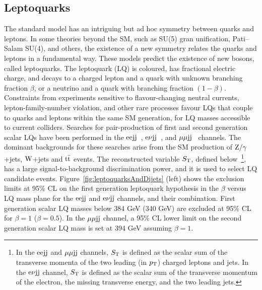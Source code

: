 \documentclass[11pt]{article}
\def\pt{\ensuremath{p_{\rm T}}\xspace}
\def\eejj{$\rm{eejj}$\xspace}
\def\mumujj{$\mu\mu \rm{jj}$\xspace}
\def\enujj{$\rm{e}\nu \rm{jj}$\xspace}
\def\zjets{\ensuremath{\rm{Z}/\gamma}+jets\xspace}
\def\wjets{\ensuremath{\rm{W}}+jets\xspace}
\def\ttbar{\ensuremath{\rm{t} \bar{\rm{t}}}\xspace}
\def\ST{\ensuremath{S_{\rm T}}\xspace}
\begin{document}
\subsection{Leptoquarks}

The standard model has an intriguing but ad hoc symmetry between 
quarks and leptons. In some theories beyond the SM, such 
as SU(5) gran unification, Pati--Salam SU(4), and others, the existence of a new symmetry 
relates the quarks and leptons in a fundamental way. These models 
predict the existence of new bosons, called leptoquarks. 
The leptoquark (LQ) is coloured, has fractional electric charge, and 
decays to a charged lepton and a quark with unknown branching 
fraction $\beta$, or a neutrino and a quark with branching fraction 
$(1-\beta)$. Constraints from experiments sensitive to flavour-changing 
neutral currents, lepton-family-number violation, and other rare processes 
favour LQs that couple to quarks and leptons within the same SM generation, 
for LQ masses accessible to current colliders. 
Searches for pair-production of first and second 
generation scalar LQs have been performed in the \eejj~\cite{PhysRevLett.106.201802}, 
\enujj~\cite{Collaboration:2011ar}, and \mumujj~\cite{PhysRevLett.106.201803} channels. 
The dominant backgrounds for these searches arise from the SM production of 
\zjets, \wjets and \ttbar events. The reconstructed variable \ST, defined 
below~\footnote{In the \eejj and \mumujj channels, 
\ST is defined as the scalar sum of the transverse momenta of the two 
leading (in \pt) charged leptons and jets. In the \enujj channel, 
\ST is defined as the scalar sum of the transverse momentum of the electron, 
the missing transverse energy, and the two leading jets.}, 
has a large signal-to-background discrimination power, 
and it is used to select LQ candidate events.
Figure~\ref{fig:leptoquarksAndDijets} (left) shows the exclusion limits at 95\% CL on 
the first generation leptoquark hypothesis in the $\beta$ versus LQ mass 
plane for the \eejj and \enujj channels, and their combination. 
First generation scalar LQ masses below 384 GeV (340 GeV) are excluded 
at 95\% CL for $\beta=1$ ($\beta=0.5$). In the \mumujj channel, a 95\% CL lower limit on 
the second generation scalar LQ mass is set at 394 GeV assuming $\beta=1$.
\end{document}
